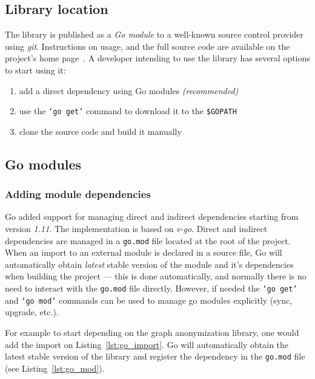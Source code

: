 \subsection{Library location}
The library is published as a \emph{Go module} to a well-known source control provider using \emph{git}. Instructions on usage, and the full source code are available on the project's home page~\cite{k-anon}. A developer intending to use the library has several options to start using it:
\begin{enumerate}
    \item add a direct dependency using Go modules \emph{(recommended)}
    \item use the \texttt{`go get'} command to download it to the \texttt{\$GOPATH}
    \item clone the source code and build it manually
\end{enumerate}

\subsection{Go modules}

\subsubsection{Adding module dependencies}

Go added support for managing direct and indirect dependencies starting from version \textit{1.11}. The implementation is based on \textit{v-go}. Direct and indirect dependencies are managed in a \texttt{go.mod} file located at the root of the project. When an import to an external module is declared in a source file, Go will automatically obtain \emph{latest} stable version of the module and it's dependencies when building the project --- this is done automatically, and normally there is no need to interact with the \texttt{go.mod} file directly. However, if needed the \texttt{`go get'} and \texttt{`go mod'} commands can be used to manage go modules explicitly (sync, upgrade, etc.).

For example to start depending on the graph anonymization library, one would add the import on Listing~\ref{lst:go_import}. Go will automatically obtain the latest stable version of the library and register the dependency in the \texttt{go.mod} file (see Listing~\ref{lst:go_mod}).






